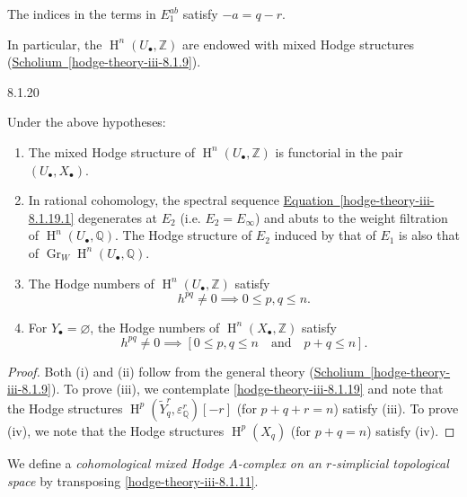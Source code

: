     The indices in the terms in \(E_1^{ab}\) satisfy \(-a=q-r\).\par{}In particular, the \(\operatorname {H}^n(U_\bullet ,\mathbb {Z})\) are endowed with mixed Hodge structures (\hyperref[hodge-theory-iii-8.1.9]{Scholium~\ref*{hodge-theory-iii-8.1.9}}).\begin{proposition}{8.1.20}\label{hodge-theory-iii-8.1.20}\skipsinglepar\par{}Under the above hypotheses:

    
 \begin{enumerate}
      
 \item[(i)]
        The mixed Hodge structure of \(\operatorname {H}^n(U_\bullet ,\mathbb {Z})\) is functorial in the pair \((U_\bullet ,X_\bullet )\).
      


      
 \item[(ii)]
        In rational cohomology, the spectral sequence \hyperref[hodge-theory-iii-8.1.19.1]{Equation~\ref*{hodge-theory-iii-8.1.19.1}} degenerates at \(E_2\) (i.e. \(E_2=E_\infty \)) and abuts to the weight filtration of \(\operatorname {H}^n(U_\bullet ,\mathbb {Q})\).
        The Hodge structure of \(E_2\) induced by that of \(E_1\) is also that of \(\operatorname {Gr}_W\operatorname {H}^n(U_\bullet ,\mathbb {Q})\).
      


      
 \item[(iii)]
        The Hodge numbers of \(\operatorname {H}^n(U_\bullet ,\mathbb {Z})\) satisfy
        \[           h^{pq}\neq 0           \implies            0\leqslant  p,q\leqslant  n.         \]
      


      
 \item[(iv)]
        For \(Y_\bullet =\varnothing \), the Hodge numbers of \(\operatorname {H}^n(X_\bullet ,\mathbb {Z})\) satisfy
        \[           h^{pq}\neq 0           \implies            [0\leqslant  p,q\leqslant  n           \quad \text {and}\quad  p+q\leqslant  n].         \]
      

    \end{enumerate}


    
  
    
    \begin{proof}\par{}Both (i) and (ii) follow from the general theory (\hyperref[hodge-theory-iii-8.1.9]{Scholium~\ref*{hodge-theory-iii-8.1.9}}).
        To prove (iii), we contemplate \cref{hodge-theory-iii-8.1.19} and note that the Hodge structures \(\operatorname {H}^p(\widetilde {Y}_q^r,\varepsilon _\mathbb {Q}^r)[-r]\) (for \(p+q+r=n\)) satisfy (iii).
        To prove (iv), we note that the Hodge structures \(\operatorname {H}^p(X_q)\) (for \(p+q=n\)) satisfy (iv).\end{proof}\end{proposition}\label{hodge-theory-iii-8.1.21}\par{}We define a \emph{cohomological mixed Hodge \(A\)-complex on an \(r\)-simplicial topological space} by transposing \cref{hodge-theory-iii-8.1.11}.
